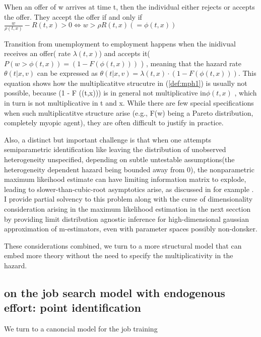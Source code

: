 \documentclass{article}
\begin{document}
When an offer of w arrives at time t, then the individual either rejects or accepts the offer. They accept the offer if and only if  $\frac{w}{\rho(t,x)} - R(t,x) >0 \iff w > \rho R(t,x) (=\phi(t,x))$

Transition from unemployment to employment happens when the inidivual receives an offer( rate $\lambda(t,x)$) and accepts it($P( w > \phi(t,x) ) = (1-F(\phi(t,x)))$ ) , meaning that the hazard rate $\theta(t|x,v)$ can be expressed as $\theta(t|x,v) = \lambda(t,x) \cdot (1-F(\phi(t,x)))$. 
This equation shows how the multiplicatitve strucutre in  (\ref{def:mph1}) is usually not possible, because (1 - F (\phi(t,x))) is in general not multiplicative in$ \phi(t,x)$ , which in turn is not multiplicative in t and x. 
While there are few special specifications when such multiplicatitve structure arise
(e.g., F(w) being a Pareto distribution, completely myopic agent), they are often difficult to justify in practice. 

Also, a distinct but important challenge is that when one attempts semiparametric identification like leaving the distribution of unobserved heterogeneity unspecified, depending on subtle untestable assumptions(the heterogeneity dependent hazard being bounded away from 0), the nonparametric maximum likeihood estimate can have 
limiting information matrix to explode, leading to
 slower-than-cubic-root asymptotics arise, as discussed in for example \cite{citehahn1994, ridder and woultersen}. I provide partial solvency to this problem along with the curse of dimensionality consideration arising in the maximum likelihood estimation in the next secction by providing limit distribution agnostic inference for 
high-dimensional gaussian approximation of m-estimators, even with parameter spaces possibly non-donsker. 

These considerations combined, we turn to a more structural model that can embed more theory without the need to specify the multiplicativity in the hazard.
\subsection{on the job search model with endogenous effort: point identification}
We turn to a canoncial model for the job training 
\end{document}
